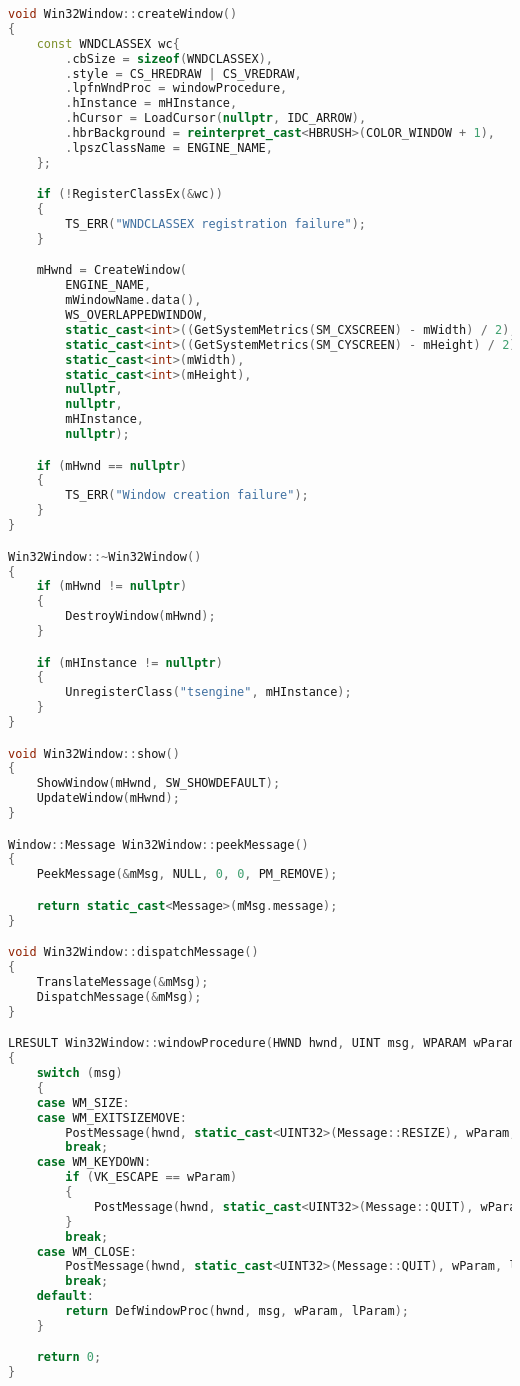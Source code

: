 \begin{lstlisting}[language=c++, caption=(./engine/src/os/win32/os.cpp)]
void Win32Window::createWindow()
{
    const WNDCLASSEX wc{
        .cbSize = sizeof(WNDCLASSEX),
        .style = CS_HREDRAW | CS_VREDRAW,
        .lpfnWndProc = windowProcedure,
        .hInstance = mHInstance,
        .hCursor = LoadCursor(nullptr, IDC_ARROW),
        .hbrBackground = reinterpret_cast<HBRUSH>(COLOR_WINDOW + 1),
        .lpszClassName = ENGINE_NAME,
    };

    if (!RegisterClassEx(&wc))
    {
        TS_ERR("WNDCLASSEX registration failure");
    }

    mHwnd = CreateWindow(
        ENGINE_NAME,
        mWindowName.data(),
        WS_OVERLAPPEDWINDOW,
        static_cast<int>((GetSystemMetrics(SM_CXSCREEN) - mWidth) / 2),
        static_cast<int>((GetSystemMetrics(SM_CYSCREEN) - mHeight) / 2),
        static_cast<int>(mWidth),
        static_cast<int>(mHeight),
        nullptr,
        nullptr,
        mHInstance,
        nullptr);

    if (mHwnd == nullptr)
    {
        TS_ERR("Window creation failure");
    }
}

Win32Window::~Win32Window()
{
    if (mHwnd != nullptr)
    {
        DestroyWindow(mHwnd);
    }

    if (mHInstance != nullptr)
    {
        UnregisterClass("tsengine", mHInstance);
    }
}

void Win32Window::show()
{
    ShowWindow(mHwnd, SW_SHOWDEFAULT);
    UpdateWindow(mHwnd);
}

Window::Message Win32Window::peekMessage()
{
    PeekMessage(&mMsg, NULL, 0, 0, PM_REMOVE);

    return static_cast<Message>(mMsg.message);
}

void Win32Window::dispatchMessage()
{
    TranslateMessage(&mMsg);
    DispatchMessage(&mMsg);
}

LRESULT Win32Window::windowProcedure(HWND hwnd, UINT msg, WPARAM wParam, LPARAM lParam)
{
    switch (msg)
    {
    case WM_SIZE:
    case WM_EXITSIZEMOVE:
        PostMessage(hwnd, static_cast<UINT32>(Message::RESIZE), wParam, lParam);
        break;
    case WM_KEYDOWN:
        if (VK_ESCAPE == wParam)
        {
            PostMessage(hwnd, static_cast<UINT32>(Message::QUIT), wParam, lParam);
        }
        break;
    case WM_CLOSE:
        PostMessage(hwnd, static_cast<UINT32>(Message::QUIT), wParam, lParam);
        break;
    default:
        return DefWindowProc(hwnd, msg, wParam, lParam);
    }

    return 0;
}
\end{lstlisting}